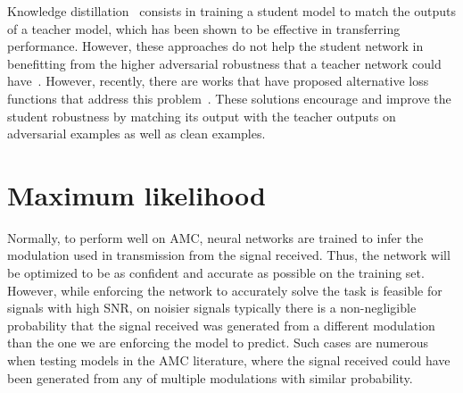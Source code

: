 \documentclass[conference]{IEEEtran}
\begin{document}
Knowledge distillation~\cite{hinton2015distilling,romero2014fitnets,zagoruyko2016paying,chebotar2016distilling} consists in training a student model to match the outputs of a teacher model, which has been shown to be effective in transferring performance. However, these approaches do not help the student network in benefitting from the higher adversarial robustness that a teacher network could have~\cite{goldblum2020adversarially}. However, recently, there are works that have proposed alternative loss functions that address this problem~\cite{goldblum2020adversarially,zi2021revisiting,zhu2021reliable,shao2021and,maroto2022benefits}. These solutions encourage and improve the student robustness by matching its output with the teacher outputs on adversarial examples as well as clean examples.

\section{Maximum likelihood}

Normally, to perform well on AMC, neural networks are trained to infer the modulation used in transmission from the signal received. Thus, the network will be optimized to be as confident and accurate as possible on the training set. However, while enforcing the network to accurately solve the task is feasible for signals with high SNR, on noisier signals typically there is a non-negligible probability that the signal received was generated from a different modulation than the one we are enforcing the model to predict. Such cases are numerous when testing models in the AMC literature, where the signal received could have been generated from any of multiple modulations with similar probability.
\end{document}
